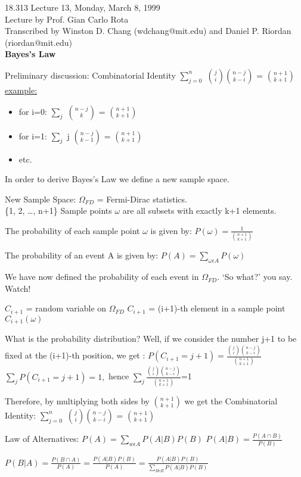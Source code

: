 {\Large 18.313 Lecture 13, Monday, March 8, 1999}\\
{\large Lecture by Prof. Gian Carlo Rota}\\
Transcribed by Winston D. Chang (wdchang@mit.edu) and Daniel P. Riordan (riordan@mit.edu)\\

{\bf Bayes's Law}

Preliminary discussion: Combinatorial Identity
$\sum_{j=0}^{n}$ ${j}\choose{i}$${n-j}\choose{k-i}$ = ${n+1}\choose{k+1}$
\underline{example:}
\begin{itemize}
\item for i=0: $\sum_{j}$ ${n-j}\choose{k}$ = ${n+1}\choose{k+1}$
\item for i=1: $\sum_{j}$  j ${n-j}\choose{k-1}$ = ${n+1}\choose{k+1}$
\item etc.
\end{itemize}

In order to derive Bayes's Law we define a new sample space.

New Sample Space: $ \Omega _{FD} $ = Fermi-Dirac statistics.\\
\{1, 2, \ldots , n+1\} Sample points $\omega$ are all subsets with exactly
k+1 elements.

The probability of each sample point $\omega$ is given by:
$P(\omega)=\frac{1}{{{n+1}\choose{k+1}}}$

The probability of an event A is given by:
$P(A)=\sum_{\omega \epsilon A}P(\omega)$

We have now defined the probability of each event in $\Omega_{FD}$. `So
what?' you say. Watch!

$C_{i+1}$ = random variable on $\Omega _{FD}$
$C_{i+1}$ = (i+1)-th element in a sample point
$C_{i+1}(\omega)$

What is the probability distribution?  Well, if we consider the number j+1 to be fixed at the (i+1)-th position, we get :
$P(C_{i+1}=j+1)=\frac{{{{j}\choose{i}}{{n-j}\choose{k-i}}}}{{{n+1}\choose{k
+1}}}$
$\sum_{j}P(C_{i+1}=j+1)=1,$ hence
$\sum_{j}\frac{{{{j}\choose{i}}{{n-j}\choose{k-i}}}}{{{n+1}\choose{k+1}}}$=1

Therefore, by multiplying both sides by ${n+1}\choose{k+1}$ we get the Combinatorial Identity:
$\sum_{j=0}^{n}$ ${j}\choose{i}$${n-j}\choose{k-i}$ = ${n+1}\choose{k+1}$

Law of Alternatives: 
$P(A)=\sum_{w \epsilon A}P(A|B)P(B)$
$P(A|B)=\frac{{P(A\cap B)}}{P(B)}$

$P(B|A)=\frac{{P(B\cap A)}}{P(A)}=\frac{P(A|B)P(B)}{P(A)}=\frac{P(A|B)P(B)}{{\sum_{B \epsilon \Pi}P(A|B)P(B)}}$

